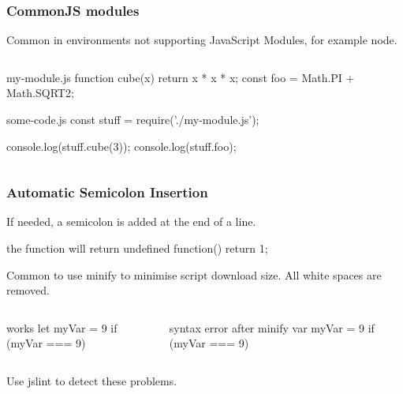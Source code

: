 \documentclass[aspectratio=1610]{beamer}
\begin{document}
\begin{frame}[fragile]
  \frametitle{CommonJS modules}
  Common in environments not supporting JavaScript Modules, for example node.
\begin{columns}[onlytextwidth]
  \begin{column}{1\textwidth}
\begin{CodeBox}{my-module.js}
function cube(x) {
  return x * x * x;
}
const foo = Math.PI + Math.SQRT2;
\end{CodeBox}
\begin{CodeBox}{some-code.js}
const stuff = require('./my-module.js');

console.log(stuff.cube(3));
console.log(stuff.foo);
\end{CodeBox}
  \end{column}
\end{columns}%
\end{frame}

\begin{frame}[fragile]
  \frametitle{Automatic Semicolon Insertion}
  If needed, a semicolon is added at the end of a line.
\begin{CodeBox}{the function will return undefined}
  function() { return
  1; }
\end{CodeBox}

\vspace{4mm}
Common to use minify to minimise script download size. All white spaces are removed.
\begin{columns}[onlytextwidth]
  \begin{column}{0.35\textwidth}
\begin{CodeBox}{works}
  let myVar = 9
  if (myVar === 9) {
  }
\end{CodeBox}
  \end{column}
  \begin{column}{0.65\textwidth}
\begin{CodeBox}{syntax error after minify}
  var myVar = 9 if (myVar === 9) {}
\end{CodeBox}
  \end{column}
  \begin{column}{0.3\textwidth}  \end{column}
\end{columns}%

\vspace{4mm}
Use jslint to detect these problems.
\end{frame}


\end{document}
